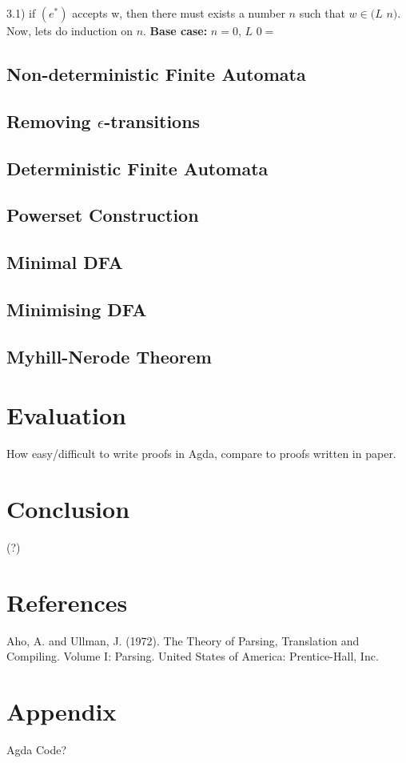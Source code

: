 \documentclass[twoside,openright,final]{bhamthesis}
\begin{document}
\par 3.1) if \((e^*)\) accepts w, then there must exists a number
\(n\) such that \(w \in (L\) \^ \(n)\). Now, lets do induction on
\(n\). \textbf{Base case:} \(n = 0\), \(L\) \^ \(0 = \)

\subsection{Non-deterministic Finite Automata}

\subsection{Removing \(\epsilon\)-transitions}

\subsection{Deterministic Finite Automata}

\subsection{Powerset Construction}

\subsection{Minimal DFA}

\subsection{Minimising DFA}

\subsection{Myhill-Nerode Theorem}

\section{Evaluation}
How easy/difficult to write proofs in Agda, compare to proofs written
in paper.

\section{Conclusion}
(?)

\section{References}
Aho, A. and Ullman, J. (1972). The Theory of Parsing, Translation and Compiling. Volume I: Parsing. United States of America: Prentice-Hall, Inc.

\section{Appendix}
Agda Code?
\end{document}
